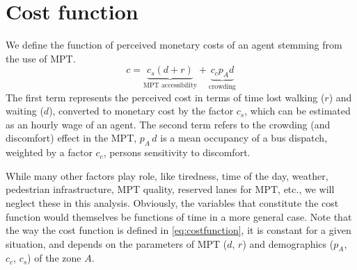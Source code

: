 \documentclass[a4paper]{report}
\begin{document}
\section{Cost function}
We define the function of perceived monetary costs of an agent stemming from the use of MPT. 
\begin{equation}
	c=\underbrace{c_s (d+r)}_{\text{MPT accessibility}}  + \underbrace{c_c p_A d}_{\text{crowding}}
	\label{eq:costfunction}
\end{equation}
The first term represents the perceived cost in terms of time lost walking ($r$) and waiting ($d$), converted to monetary cost by the factor $c_s$, which can be estimated as an hourly wage of an agent. The second term refers to the crowding (and discomfort) effect in the MPT, $p_A\,d$ is a mean occupancy of a bus dispatch, weighted by a factor $c_c$, persons sensitivity to discomfort.%

While many other factors play role, like tiredness, time of the day, weather, pedestrian infrastructure, MPT quality, reserved lanes for MPT, etc., we will neglect these in this analysis. Obviously, the variables that constitute the cost function would themselves be functions of time in a more general case. Note that the way the cost function is defined in \autoref{eq:costfunction}, it is constant for a given situation, and depends on the parameters of MPT ($d$, $r$) and demographics ($p_A$, $c_c$, $c_s$) of the zone $A$.%
\end{document}
